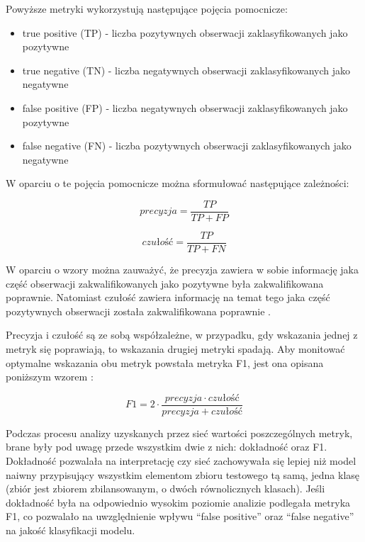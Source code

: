 \noindent Powyższe metryki wykorzystują następujące pojęcia pomocnicze:
\begin{itemize}
    \item true positive (TP) - liczba pozytywnych obserwacji zaklasyfikowanych jako pozytywne
    \item true negative (TN) - liczba negatywnych obserwacji zaklasyfikowanych jako negatywne
    \item false positive (FP) - liczba negatywnych obserwacji zaklasyfikowanych jako pozytywne
    \item false negative (FN) - liczba pozytywnych obserwacji zaklasyfikowanych jako negatywne
\end{itemize}


\noindent W oparciu o te pojęcia pomocnicze można sformułować następujące zależności:


$$
    precyzja = \frac{TP}{TP + FP}
$$

$$
    czułość = \frac{TP}{TP + FN}
$$





W oparciu o wzory można zauważyć, że precyzja zawiera w sobie informację jaka część obserwacji zakwalifikowanych jako pozytywne była zakwalifikowana poprawnie. Natomiast czułość zawiera informację na temat tego jaka część pozytywnych obserwacji została zakwalifikowana poprawnie \cite{metryki_1}.

Precyzja i czułość są ze sobą współzależne, w przypadku, gdy wskazania jednej z metryk się poprawiają, to wskazania drugiej metryki spadają. Aby monitować optymalne wskazania obu metryk powstała metryka F1, jest ona opisana poniższym wzorem \cite{metryki_2}:

$$
    F1 = 2 \cdot \frac{precyzja \cdot czułość}{precyzja + czułość}
$$

Podczas procesu analizy uzyskanych przez sieć wartości poszczególnych metryk, brane były pod uwagę przede wszystkim dwie z nich: dokładność oraz F1. Dokładność pozwalała na interpretację czy sieć zachowywała się lepiej niż model naiwny przypisujący wszystkim elementom zbioru testowego tą samą, jedna klasę (zbiór jest zbiorem zbilansowanym, o dwóch równolicznych klasach). Jeśli dokładność była na odpowiednio wysokim poziomie analizie podlegała metryka F1, co pozwalało na uwzględnienie wpływu “false positive” oraz “false negative” na jakość klasyfikacji modelu. 





